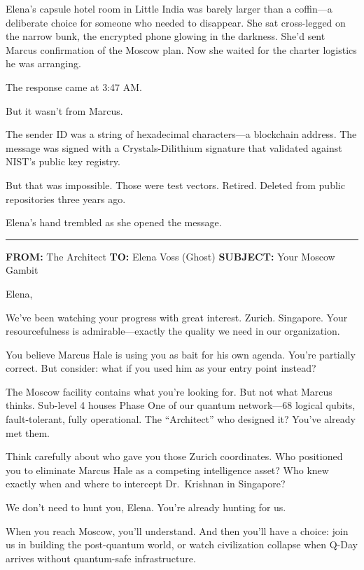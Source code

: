 Elena's capsule hotel room in Little India was barely larger than a coffin---a deliberate choice for someone who needed to disappear. She sat cross-legged on the narrow bunk, the encrypted phone glowing in the darkness. She'd sent Marcus confirmation of the Moscow plan. Now she waited for the charter logistics he was arranging.

The response came at 3:47 AM.

But it wasn't from Marcus.

The sender ID was a string of hexadecimal characters---a blockchain address. The message was signed with a Crystals-Dilithium signature that validated against NIST's public key registry.

But that was impossible. Those were test vectors. Retired. Deleted from public repositories three years ago.

Elena's hand trembled as she opened the message.

\begin{center}\rule{0.5\linewidth}{0.5pt}\end{center}

\textbf{FROM:} The Architect \textbf{TO:} Elena Voss (Ghost) \textbf{SUBJECT:} Your Moscow Gambit

Elena,

We've been watching your progress with great interest. Zurich. Singapore. Your resourcefulness is admirable---exactly the quality we need in our organization.

You believe Marcus Hale is using you as bait for his own agenda. You're partially correct. But consider: what if you used him as your entry point instead?

The Moscow facility contains what you're looking for. But not what Marcus thinks. Sub-level 4 houses Phase One of our quantum network---68 logical qubits, fault-tolerant, fully operational. The ``Architect'' who designed it? You've already met them.

Think carefully about who gave you those Zurich coordinates. Who positioned you to eliminate Marcus Hale as a competing intelligence asset? Who knew exactly when and where to intercept Dr.~Krishnan in Singapore?

We don't need to hunt you, Elena. You're already hunting for us.

When you reach Moscow, you'll understand. And then you'll have a choice: join us in building the post-quantum world, or watch civilization collapse when Q-Day arrives without quantum-safe infrastructure.

